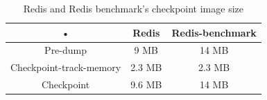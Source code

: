 \begin{table}[hbtp]
\begin{center}
\begin{tabular}{|c|c|c|}
\hline 
• & Redis & Redis-benchmark \\ 
\hline 
Pre-dump & 9 MB & 14 MB \\ 
\hline 
Checkpoint-track-memory & 2.3 MB & 2.3 MB \\ 
\hline 
Checkpoint & 9.6 MB & 14 MB \\ 
\hline 
\end{tabular}
\caption{Redis and Redis benchmark's checkpoint image size}
\label{table:redis image size}
\end{center}
\end{table}
